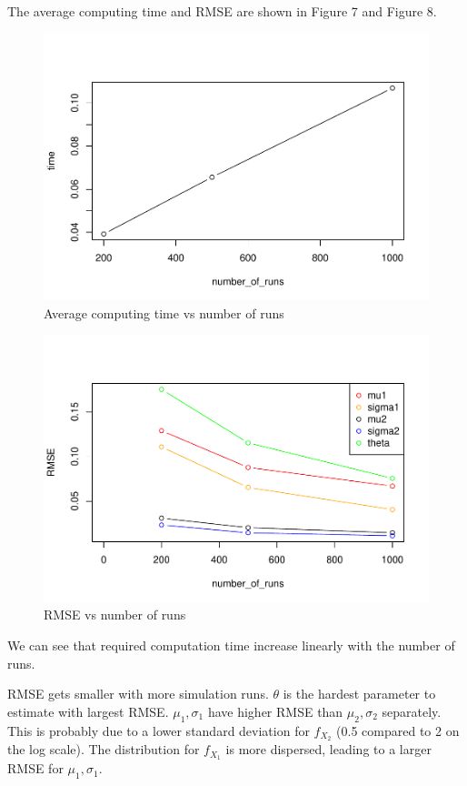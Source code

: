 \documentclass[11pt,]{article}
\begin{document}
The average computing time and RMSE are shown in Figure 7 and Figure 8.

\begin{figure}
\centering
\includegraphics{figs/unnamed-chunk-14.pdf}
\caption{Average computing time vs number of runs}
\end{figure}

\begin{figure}
\centering
\includegraphics{figs/unnamed-chunk-15.pdf}
\caption{RMSE vs number of runs}
\end{figure}

We can see that required computation time increase linearly with the
number of runs.

RMSE gets smaller with more simulation runs. \(\theta\) is the hardest
parameter to estimate with largest RMSE. \(\mu_1, \sigma_1\) have higher
RMSE than \(\mu_2, \sigma_2\) separately. This is probably due to a
lower standard deviation for \(f_{X_2}\) (0.5 compared to 2 on the log
scale). The distribution for \(f_{X_1}\) is more dispersed, leading to a
larger RMSE for \(\mu_1, \sigma_1\).
\end{document}
